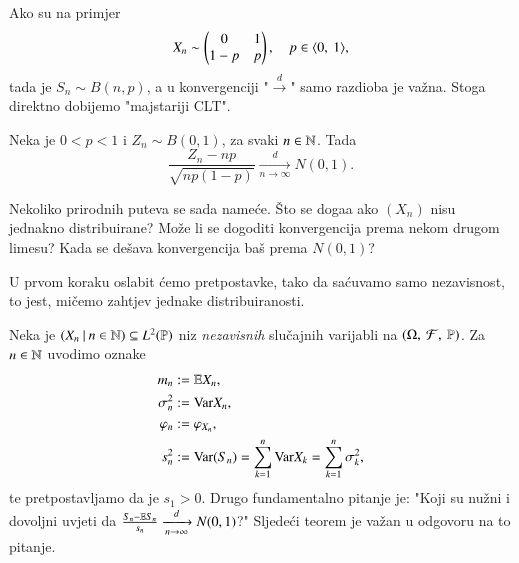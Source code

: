Ako su na primjer
\begin{equation*}
    X_n \sim
    \begin{pmatrix}
        0 & 1\\
        1 - p & p
    \end{pmatrix},
    \quad p \in \langle {0}, \: {1} \rangle,
\end{equation*}
tada je $S_n \sim B (n, p)$, a u konvergenciji "$\xrightarrow{d}$" samo razdioba je va\v zna.
Stoga direktno dobijemo "majstariji CLT".

\begin{kor}  \label{kor:19.2}
    Neka je $0 < p < 1$ i $Z_n \sim B (0, 1)$, za svaki $n \in \mathbb{N}$.
    Tada
    \begin{equation*}
        \frac{Z_n - n p}{\sqrt{n p (1 - p)}} \xrightarrow[n \to \infty]{d} N (0, 1).
    \end{equation*}
\end{kor}

\begin{nap} \label{nap:19.3}
    Nekoliko prirodnih puteva se sada name\' ce.
    \v Sto se doga\dj a ako $(X_n)$ nisu jednakno distribuirane?
    Mo\v ze li se dogoditi konvergencija prema nekom drugom limesu?
    Kada se de\v sava konvergencija ba\v s prema $N(0, 1)$?
\end{nap}

U prvom koraku oslabit \' cemo pretpostavke, tako da sa\' cuvamo samo nezavisnost, to jest, mi\v cemo zahtjev jednake distribuiranosti.

Neka je $({X_n} \: | \: {n \in \mathbb{N}}) \subseteq L^2 (\mathbb{P})$ niz \emph{nezavisnih} slu\v cajnih varijabli na $(\Omega, \: \mathcal{F}, \: \mathbb{P})$.
Za $n \in \mathbb{N}$ uvodimo oznake
\begin{equation*}
    \begin{aligned}
        m_n &:= \mathbb{E} X_n,\\
        \sigma^2_n &:= \mathrm{Var} X_n,\\
        \varphi_n &:= \varphi_{X_n},\\
        s^2_n &:= \mathrm{Var} (S_n) = \sum\limits_{k = 1}^{n} \mathrm{Var} X_k = \sum\limits_{k = 1}^{n} \sigma^2_k,
    \end{aligned}
\end{equation*}
te pretpostavljamo da je $s_1 > 0$.
Drugo fundamentalno pitanje je: "Koji su nu\v zni i dovoljni uvjeti
da $\frac{S_n - \mathbb{E} S_n}{s_n} \xrightarrow[n \to \infty]{d} N(0, 1)$?"
Sljede\' ci teorem je va\v zan u odgovoru na to pitanje.

